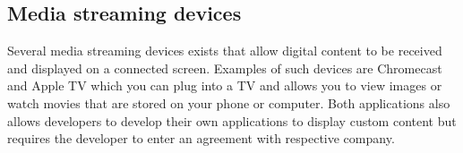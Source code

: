 \documentclass[12pt,a4paper,notitlepage]{report}
\begin{document}
\subsection{Media streaming devices}
Several media streaming devices exists that allow digital content to be received and displayed on a connected screen. Examples of such devices are Chromecast \cite{chromecast} and Apple TV \cite{appletv} which you can plug into a TV and allows you to view images or watch movies that are stored on your phone or computer. Both applications also allows developers to develop their own applications to display custom content but requires the developer to enter an agreement with respective company.


%
%
%
%
\end{document}
